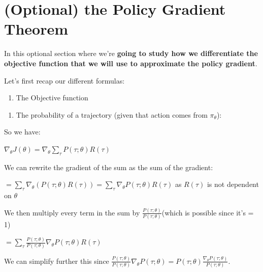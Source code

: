 \documentclass[11pt,a4paper]{article}
\begin{document}
\section{(Optional) the Policy Gradient Theorem}\label{optional-the-policy-gradient-theorem}

In this optional section where we're \textbf{going to study how we differentiate the objective function that we will use to approximate the policy gradient}.

Let's first recap our different formulas:

\begin{enumerate}
\def\labelenumi{\arabic{enumi}.}
\tightlist
\item
  The Objective function
\end{enumerate}


\begin{enumerate}
\def\labelenumi{\arabic{enumi}.}
\setcounter{enumi}{1}
\tightlist
\item
  The probability of a trajectory (given that action comes from \(\pi_\theta\)):
\end{enumerate}


So we have:

\(\nabla_\theta J(\theta) =  \nabla_\theta \sum_{\tau}P(\tau;\theta)R(\tau)\)

We can rewrite the gradient of the sum as the sum of the gradient:

\(=  \sum_{\tau} \nabla_\theta (P(\tau;\theta)R(\tau)) = \sum_{\tau} \nabla_\theta P(\tau;\theta)R(\tau)\) as \(R(\tau)\) is not dependent on \(\theta\)

We then multiply every term in the sum by \(\frac{P(\tau;\theta)}{P(\tau;\theta)}\)(which is possible since it's = 1)

\(= \sum_{\tau} \frac{P(\tau;\theta)}{P(\tau;\theta)}\nabla_\theta P(\tau;\theta)R(\tau)\)

We can simplify further this since \(\frac{P(\tau;\theta)}{P(\tau;\theta)}\nabla_\theta P(\tau;\theta) =  P(\tau;\theta)\frac{\nabla_\theta P(\tau;\theta)}{P(\tau;\theta)}\).
\end{document}
